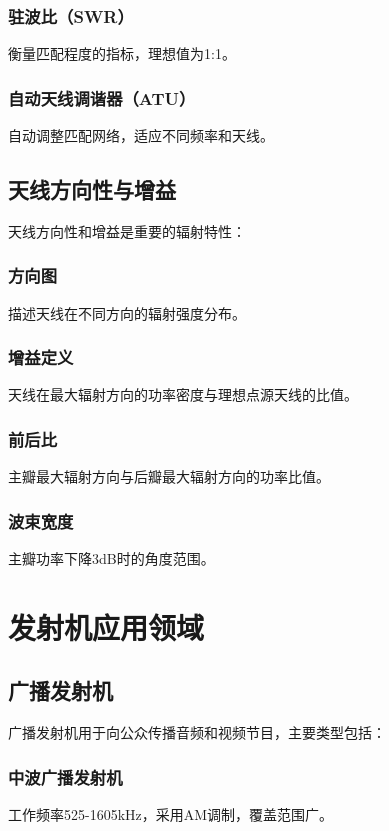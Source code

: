 \documentclass[12pt,UTF8]{ctexbook}
\begin{document}
\subsubsection{驻波比（SWR）}
衡量匹配程度的指标，理想值为1:1。

\subsubsection{自动天线调谐器（ATU）}
自动调整匹配网络，适应不同频率和天线。

\subsection{天线方向性与增益}

天线方向性和增益是重要的辐射特性：

\subsubsection{方向图}
描述天线在不同方向的辐射强度分布。

\subsubsection{增益定义}
天线在最大辐射方向的功率密度与理想点源天线的比值。

\subsubsection{前后比}
主瓣最大辐射方向与后瓣最大辐射方向的功率比值。

\subsubsection{波束宽度}
主瓣功率下降3dB时的角度范围。

\section{发射机应用领域}

\subsection{广播发射机}

广播发射机用于向公众传播音频和视频节目，主要类型包括：

\subsubsection{中波广播发射机}
工作频率525-1605kHz，采用AM调制，覆盖范围广。
\end{document}
